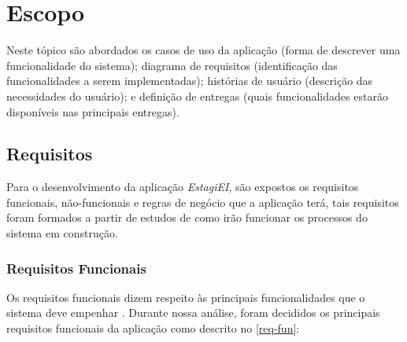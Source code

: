 \section{Escopo}

Neste tópico são abordados os casos de uso da aplicação (forma de descrever uma funcionalidade do sistema); diagrama de requisitos (identificação das funcionalidades a serem implementadas); histórias de usuário (descrição das necessidades do usuário); e definição de entregas (quais funcionalidades estarão disponíveis nas principais entregas).
\subsection{Requisitos}

Para o desenvolvimento da aplicação \emph{EstagiEI}, são expostos os requisitos funcionais, não-funcionais e regras de negócio que a aplicação terá, tais requisitos foram formados a partir de estudos de como irão funcionar os processos do sistema em construção.

\subsubsection{Requisitos Funcionais}

Os requisitos funcionais dizem respeito às principais funcionalidades que o sistema deve empenhar \cite{sommerville}. Durante nossa análise, foram decididos os principais requisitos funcionais da aplicação como descrito no \autoref{req-fun}:

